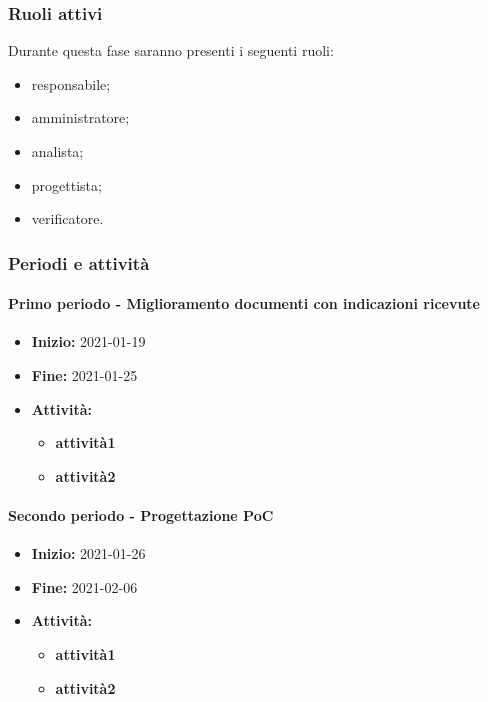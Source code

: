 \subsubsection{Ruoli attivi}
Durante questa fase saranno presenti i seguenti ruoli:
\begin{itemize}
    \item responsabile;
    \item amministratore;
    \item analista;
    \item progettista;
    \item verificatore.
\end{itemize}

\subsubsection{Periodi e attività}

\paragraph[Primo periodo]{Primo periodo - \textnormal{Miglioramento documenti con indicazioni ricevute}}
\begin{itemize}
    \item [] \textbf{Inizio:} 2021-01-19
    \item [] \textbf{Fine:} 2021-01-25
    \item [] \textbf{Attività:}
          \begin{itemize}
              \item \textbf{attività1}
              \item \textbf{attività2}
          \end{itemize}
\end{itemize}

\paragraph[Secondo periodo]{Secondo periodo - \textnormal{Progettazione PoC}}
\begin{itemize}
    \item [] \textbf{Inizio:} 2021-01-26
    \item [] \textbf{Fine:} 2021-02-06
    \item [] \textbf{Attività:}
          \begin{itemize}
            \item \textbf{attività1}
            \item \textbf{attività2}
          \end{itemize}
\end{itemize}

